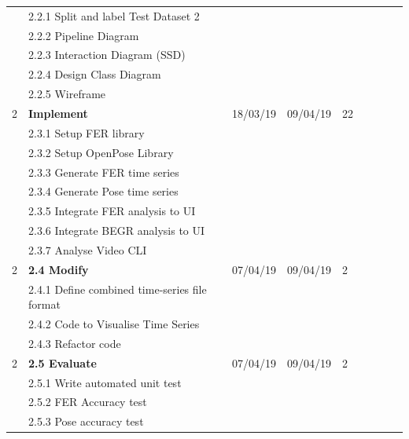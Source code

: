 \documentclass[12pt,a4paper,man]{report}
\begin{document}
\begin{longtable}{|l|l|l|l|l|l|l|lp{3cm}|}
 & 2.2.1 Split and label Test Dataset 2 &  &  & \\
 & 2.2.2 Pipeline Diagram &  &  & \\
 & 2.2.3 Interaction Diagram (SSD) &  &  & \\
 & 2.2.4 Design Class Diagram &  &  & \\
 & 2.2.5 Wireframe &  &  & \\
\hline
2 & \textbf{Implement} & 18/03/19 & 09/04/19 & 22\\
 & 2.3.1 Setup FER library &  &  & \\
 & 2.3.2 Setup OpenPose Library &  &  & \\
 & 2.3.3 Generate FER time series &  &  & \\
 & 2.3.4 Generate Pose time series &  &  & \\
 & 2.3.5 Integrate FER analysis to UI &  &  & \\
 & 2.3.6 Integrate BEGR analysis to UI &  &  & \\
 & 2.3.7 Analyse Video CLI &  &  & \\
\hline
2 & \textbf{2.4 Modify} & 07/04/19 & 09/04/19 & 2\\
 & 2.4.1 Define combined time-series file format &  &  & \\
 & 2.4.2 Code to Visualise Time Series &  &  & \\
 & 2.4.3 Refactor code &  &  & \\
\hline
2 & \textbf{2.5 Evaluate} & 07/04/19 & 09/04/19 & 2\\
 & 2.5.1 Write automated unit test &  &  & \\
 & 2.5.2 FER Accuracy test &  &  & \\
 & 2.5.3 Pose accuracy test &  &  & \\
\hline
\end{longtable}
\end{document}
